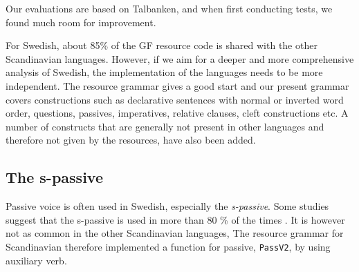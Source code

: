\documentclass[10pt, a4paper]{article}
\begin{document}
Our evaluations are based on Talbanken, and when first conducting tests,
we found much room for improvement.

For Swedish, about 85\% of the GF resource code is shared with the other Scandinavian
languages. 
However, if we aim for a deeper and more comprehensive analysis of Swedish,
the implementation of the languages needs to be more independent.
The resource grammar gives a good start and our present grammar 
covers constructions such as declarative sentences with normal or inverted
word order, questions, passives, imperatives, relative clauses, cleft
constructions etc.
A number of constructs that are generally not present in other languages and
therefore not given by the resources, have also been added. 
\subsection{The s-passive}
Passive voice is often used in Swedish, especially the
\textit{s-passive}.
\label{sent:skrevs}
Some studies suggest that the s-passive is used in more than 80 \% of the times
\cite{laanemets}.
It is however not as common in the other Scandinavian languages, 
The resource grammar for Scandinavian therefore implemented a function for passive,
\verb-PassV2-, by using auxiliary verb. \\
\end{document}
